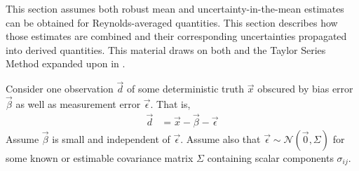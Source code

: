 \documentclass[letterpaper,11pt,nointlimits,reqno,draft]{amsbook}
\begin{document}
This section assumes both robust mean and uncertainty-in-the-mean estimates can
be obtained for Reynolds-averaged quantities.  This section describes how those
estimates are combined and their corresponding uncertainties propagated into
derived quantities.  This material draws on both \citet{Ku1966Notes} and the
Taylor Series Method expanded upon in \citet{Coleman2009Experimentation}.

Consider one observation $\vec{d}$  of some deterministic truth $\vec{x}$
obscured by bias error $\vec{\beta}$ as well as measurement error
$\vec{\epsilon}$. That is,
\begin{align*}
  \vec{d} &= \vec{x} - \vec{\beta} - \vec{\epsilon}
\end{align*}
Assume $\vec{\beta}$ is small and independent of $\vec{\epsilon}$.  Assume also
that $\vec{\epsilon} \sim \mathcal{N}(\vec{0}, \Sigma)$ for some known or
estimable covariance matrix $\Sigma$ containing scalar components
$\sigma_{ij}$.
\end{document}
